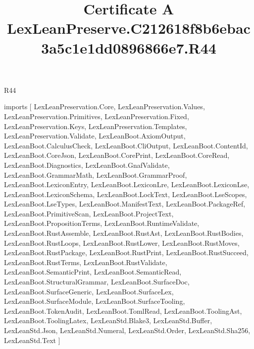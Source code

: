 \begin{lexlean}{R44}
\title{Certificate A LexLeanPreserve.C212618f8b6ebac3a5c1e1dd0896866e7.R44}
\begin{coremodule}
imports [
  LexLeanPreservation.Core,
  LexLeanPreservation.Values,
  LexLeanPreservation.Primitives,
  LexLeanPreservation.Fixed,
  LexLeanPreservation.Keys,
  LexLeanPreservation.Templates,
  LexLeanPreservation.Validate,
  LexLeanBoot.AxiomOutput,
  LexLeanBoot.CalculusCheck,
  LexLeanBoot.CliOutput,
  LexLeanBoot.ContentId,
  LexLeanBoot.CoreJson,
  LexLeanBoot.CorePrint,
  LexLeanBoot.CoreRead,
  LexLeanBoot.Diagnostics,
  LexLeanBoot.GnafValidate,
  LexLeanBoot.GrammarMath,
  LexLeanBoot.GrammarProof,
  LexLeanBoot.LexiconEntry,
  LexLeanBoot.LexiconLre,
  LexLeanBoot.LexiconLse,
  LexLeanBoot.LexiconSchema,
  LexLeanBoot.LockText,
  LexLeanBoot.LseScopes,
  LexLeanBoot.LseTypes,
  LexLeanBoot.ManifestText,
  LexLeanBoot.PackageRef,
  LexLeanBoot.PrimitiveScan,
  LexLeanBoot.ProjectText,
  LexLeanBoot.PropositionTerms,
  LexLeanBoot.RuntimeValidate,
  LexLeanBoot.RustAssemble,
  LexLeanBoot.RustAst,
  LexLeanBoot.RustBodies,
  LexLeanBoot.RustLoops,
  LexLeanBoot.RustLower,
  LexLeanBoot.RustMoves,
  LexLeanBoot.RustPackage,
  LexLeanBoot.RustPrint,
  LexLeanBoot.RustSucceed,
  LexLeanBoot.RustTerms,
  LexLeanBoot.RustValidate,
  LexLeanBoot.SemanticPrint,
  LexLeanBoot.SemanticRead,
  LexLeanBoot.StructuralGrammar,
  LexLeanBoot.SurfaceDoc,
  LexLeanBoot.SurfaceGeneric,
  LexLeanBoot.SurfaceLex,
  LexLeanBoot.SurfaceModule,
  LexLeanBoot.SurfaceTooling,
  LexLeanBoot.TokenAudit,
  LexLeanBoot.TomlRead,
  LexLeanBoot.ToolingAst,
  LexLeanBoot.ToolingLatex,
  LexLeanStd.Blake3,
  LexLeanStd.Buffer,
  LexLeanStd.Json,
  LexLeanStd.Numeral,
  LexLeanStd.Order,
  LexLeanStd.Sha256,
  LexLeanStd.Text
]


\end{coremodule}
\end{lexlean}
